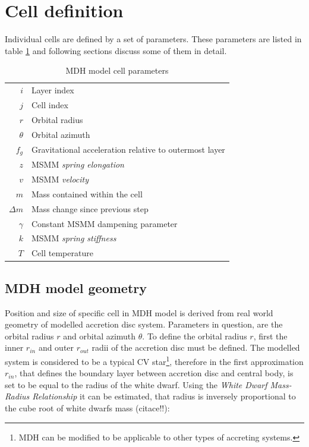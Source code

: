 \section{Cell definition}
Individual cells are defined by a set of parameters. These parameters are listed in table \ref{table:mdh_cell_parameters} and following sections discuss some of them in detail.

\vspace{5mm}

\begin{table}[h]
\begin{center}
\begin{tabular}{r|l}
$i$			& Layer index \\
$j$			& Cell index \\
$r$			& Orbital radius \\
$\theta$	& Orbital azimuth \\ 
$f_g$		& Gravitational acceleration relative to outermost layer \\
$z$			& MSMM \emph{spring elongation}  \\
$v$			& MSMM \emph{velocity} \\
$m$			& Mass contained within the cell \\
$\Delta m$ 	& Mass change since previous step \\
$\gamma$		& Constant MSMM dampening parameter \\
$k$			& MSMM \emph{spring stiffness} \\
$T$			& Cell temperature
\end{tabular}
\caption{MDH model cell parameters}
\label{table:mdh_cell_parameters}
\end{center}
\end{table}

\subsection{MDH model geometry}
Position and size of specific cell in MDH model is derived from real world geometry of modelled accretion disc system. Parameters in question, are the orbital radius $r$ and orbital azimuth $\theta$. To define the orbital radius $r$, first the inner $r_{in}$ and outer $r_{out}$ radii of the accretion disc must be defined. The modelled system is considered to be a typical CV star\footnote{MDH can be modified to be applicable to other types of accreting systems.}, therefore in the first approximation $r_{in}$, that defines the boundary layer between accretion disc and central body, is set to be equal to the radius of the white dwarf. Using the \emph{White Dwarf Mass-Radius Relationship} it can be estimated, that radius is inversely proportional to the cube root of white dwarfs mass (citace!!):

